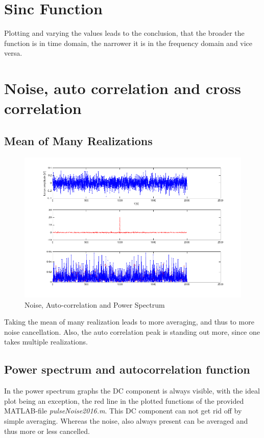 \documentclass[12pt]{article}
\begin{document}
\section{Sinc Function}

Plotting and varying the values leads to the conclusion, that the broader the function is in time domain, the narrower it is in the frequency domain and vice versa.


\section{Noise, auto correlation and cross correlation}
\subsection{Mean of Many Realizations}

\begin{figure}[h!]
	\centering
	\includegraphics[width=\linewidth]{images/ass1_12}	
	\caption{Noise, Auto-correlation and Power Spectrum}
	\label{fig:12_1}
\end{figure}

Taking the mean of many realization leads to more averaging, and thus to more noise cancellation. Also, the auto correlation peak is standing out more, since one takes multiple realizations.

\subsection{Power spectrum and autocorrelation function}

In the power spectrum graphs the DC component is always visible, with the ideal plot being an exception, the red line in the plotted functions of the provided MATLAB-file \textit{pulseNoise2016.m}. This DC component can not get rid off by simple averaging. Whereas the noise, also always present can be averaged and thus more or less cancelled.
\end{document}
